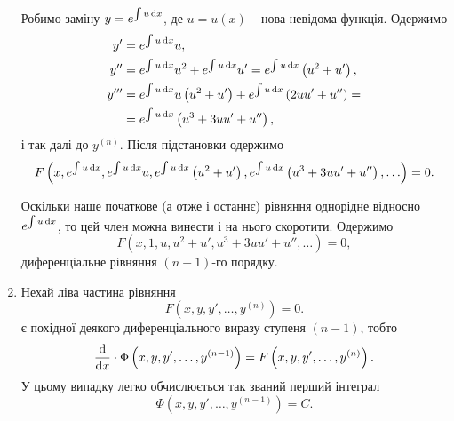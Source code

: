 \begin{enumerate}
Робимо заміну $y = e^{\int u \mathop{}\!\mathrm{d} x}$, де $u=u(x)$ -- нова невідома функція. Одержимо
\begin{align}
	y' &= e^{\int u \mathop{}\!\mathrm{d} x} u, \\
	y^{\prime\prime} &= e^{\int u \mathop{}\!\mathrm{d} x}  u^2 + e^{\int u \mathop{}\!\mathrm{d} x} u' = e^{\int u \mathop{}\!\mathrm{d} x} \left(u^2 + u'\right), \\
	y^{\prime\prime\prime} &= e^{\int u \mathop{}\!\mathrm{d} x} u \left( u^2 + u' \right) + e^{\int u \mathop{}\!\mathrm{d} x}  \left(2 u u' + u''\right) = \\ 
	&= e^{\int u \mathop{}\!\mathrm{d} x} \left( u^3 + 3 u u' + u'' \right), \nonumber
\end{align}
і так далі до $y^{(n)}$. Після підстановки одержимо
\begin{equation*}
	F \left( x, e^{\int u \mathop{}\!\mathrm{d} x}, e^{\int u \mathop{}\!\mathrm{d} x} u, e^{\int u \mathop{}\!\mathrm{d} x} \left(u^2 + u'\right), e^{\int u \mathop{}\!\mathrm{d} x} \left( u^3 + 3 u u' + u'' \right), \ldots \right) = 0.
\end{equation*}

Оскільки наше початкове (а отже і останнє) рівняння однорідне відносно $e^{\int u\mathop{}\!\mathrm{d} x}$, то цей член можна винести і на нього скоротити. Одержимо
\begin{equation*}
	F \left( x, 1, u, u^2 + u', u^3 + 3 u u' + u'', \ldots \right) = 0,
\end{equation*} 
диференціальне рівняння $(n-1)$-го порядку. 
\item Нехай ліва частина рівняння
\begin{equation*}
	F \left( x, y, y', \ldots, y^{(n)} \right) = 0.
\end{equation*}
є похідної деякого диференціального виразу ступеня $(n-1)$, тобто
\begin{equation*}
	\frac{\mathop{}\!\mathrm{d}}{\mathop{}\!\mathrm{d} x} \cdot \Phi\left( x, y, y', \ldots, y^{(n-1)} \right) = F \left( x, y, y', \ldots, y^{(n)} \right).
\end{equation*}
У цьому випадку легко обчислюється так званий перший інтеграл
\begin{equation*}
	\Phi\left( x, y, y', \ldots, y^{(n-1)} \right) = C.
\end{equation*}


\end{enumerate}
